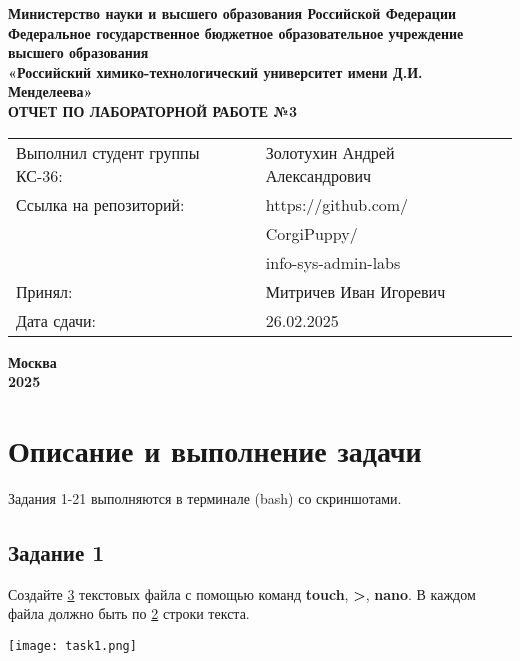\documentclass[12pt, a4paper]{report}
\begin{document}
	\begin{titlepage}
			\begin{center}
				\large \textbf{Министерство науки и высшего образования Российской Федерации} \\
				\large \textbf{Федеральное государственное бюджетное образовательное учреждение высшего образования} \\
				\large \textbf{«Российский химико-технологический университет имени Д.И. Менделеева»} \\

				\vspace*{4cm}
				\LARGE \textbf{ОТЧЕТ ПО ЛАБОРАТОРНОЙ РАБОТЕ №3}

				\vspace*{4cm}
				\begin{flushright}
					\Large
					\begin{tabular}{>{\raggedleft\arraybackslash}p{8.85cm} p{10.8cm}}
						Выполнил студент группы КС-36: & Золотухин Андрей Александрович \\
						Ссылка на репозиторий: & https://github.com/ \\ 
						& CorgiPuppy/ \\
						& info-sys-admin-labs \\
						Принял: & Митричев Иван Игоревич \\
						Дата сдачи: & 26.02.2025 \\
					\end{tabular}

				\end{flushright}

				\vspace*{6cm}
				\Large \textbf{Москва \\ 2025}
			\end{center}
		\end{titlepage}
		
		\tableofcontents	
		\thispagestyle{empty}
		\newpage

		
		\section*{Описание и выполнение задачи}
		\large
		Задания 1-21 выполняются в терминале (bash) со скриншотами. \par

			\subsection*{Задание 1}
			Создайте \underline{3} текстовых файла с помощью команд \textbf{touch}, \textbf{>}, \textbf{nano}. В каждом файла должно быть по \underline{2} строки текста.
			\lstset{style=mystyle}
			
			\begin{center}
				\texttt{[image: task1.png]}
			\end{center}
\end{document}
